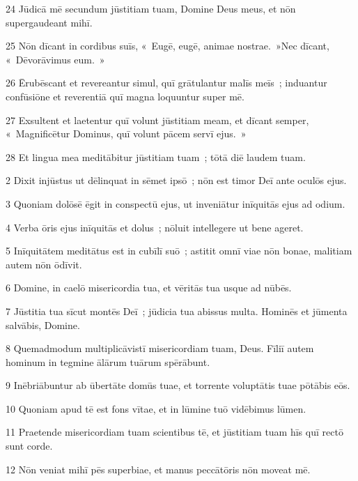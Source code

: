\psalmVerse
  {\phantom{0}24}
  {Jūdicā mē secundum jūstitiam tuam, Domine Deus meus, et nōn supergaudeant mihī.}


\psalmVerse
  {\phantom{0}25}
  {Nōn dīcant in cordibus suīs, «~Eugē, eugē, animae nostrae.~»Nec dīcant, «~Dēvorāvimus eum.~»}


\psalmVerse
  {\phantom{0}26}
  {Ērubēscant et revereantur simul, quī grātulantur malīs meīs~; induantur confūsiōne et reverentiā quī magna loquuntur super mē.}


\psalmVerse
  {\phantom{0}27}
  {Exsultent et laetentur quī volunt jūstitiam meam, et dīcant semper, «~Magnificētur Dominus, quī volunt pācem servī ejus.~»}


\psalmVerse
  {\phantom{0}28}
  {Et lingua mea meditābitur jūstitiam tuam~; tōtā diē laudem tuam.}



\psalmVerse
  {\phantom{00}2}
  {Dixit injūstus ut dēlinquat in sēmet ipsō~; nōn est timor Deī ante oculōs ejus.}


\psalmVerse
  {\phantom{00}3}
  {Quoniam dolōsē ēgit in conspectū ejus, ut inveniātur inīquitās ejus ad odium.}


\psalmVerse
  {\phantom{00}4}
  {Verba ōris ejus inīquitās et dolus~; nōluit intellegere ut bene ageret.}


\psalmVerse
  {\phantom{00}5}
  {Inīquitātem meditātus est in cubīlī suō~; astitit omnī viae nōn bonae, malitiam autem nōn ōdīvit.}


\psalmVerse
  {\phantom{00}6}
  {Domine, in caelō misericordia tua, et vēritās tua usque ad nūbēs.}


\psalmVerse
  {\phantom{00}7}
  {Jūstitia tua sīcut montēs Deī~; jūdicia tua abissus multa. Hominēs et jūmenta salvābis, Domine.}


\psalmVerse
  {\phantom{00}8}
  {Quemadmodum multiplicāvistī misericordiam tuam, Deus. Fīliī autem hominum in tegmine ālārum tuārum spērābunt.}


\psalmVerse
  {\phantom{00}9}
  {Inēbriābuntur ab ūbertāte domūs tuae, et torrente voluptātis tuae pōtābis eōs.}


\psalmVerse
  {\phantom{0}10}
  {Quoniam apud tē est fons vītae, et in lūmine tuō vidēbimus lūmen.}


\psalmVerse
  {\phantom{0}11}
  {Praetende misericordiam tuam scientibus tē, et jūstitiam tuam hīs quī rectō sunt corde.}


\psalmVerse
  {\phantom{0}12}
  {Nōn veniat mihī pēs superbiae, et manus peccātōris nōn moveat mē.}


